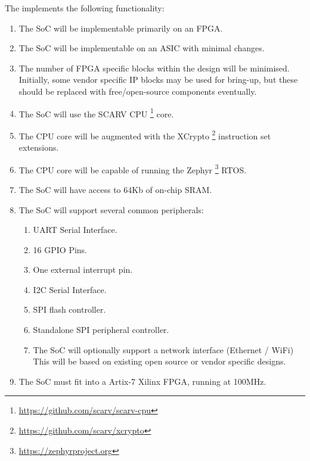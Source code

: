 
The \SCARVSOC implements the following functionality:

\begin{enumerate}

\item  The SoC will be implementable primarily on an FPGA.

\item The SoC will be implementable on an ASIC with minimal changes.

\item The number of FPGA specific blocks within the design will be minimised.
    Initially, some vendor specific IP blocks may be used for bring-up, but
    these should be replaced with free/open-source components eventually.

\item The SoC will use the SCARV CPU
    \footnote{\url{https://github.com/scarv/scarv-cpu}}
    core.

\item The CPU core will be augmented with the XCrypto
    \footnote{\url{https://github.com/scarv/xcrypto}}
    instruction set extensions.

\item The CPU core will be capable of running the Zephyr
    \footnote{\url{https://zephyrproject.org}}
    RTOS.

\item The SoC will have access to 64Kb of on-chip SRAM.

\item The SoC will support several common peripherals:

\begin{enumerate}

\item UART Serial Interface.

\item 16 GPIO Pins.

\item One external interrupt pin.
\item I2C Serial Interface.
\item SPI flash controller.
\item Standalone SPI peripheral controller.

\item The SoC will optionally support a network interface (Ethernet / WiFi)
      This will be based on existing open source or vendor specific designs.

\end{enumerate}

\item The SoC must fit into a Artix-7 Xilinx FPGA, running at 100MHz.


\end{enumerate}

